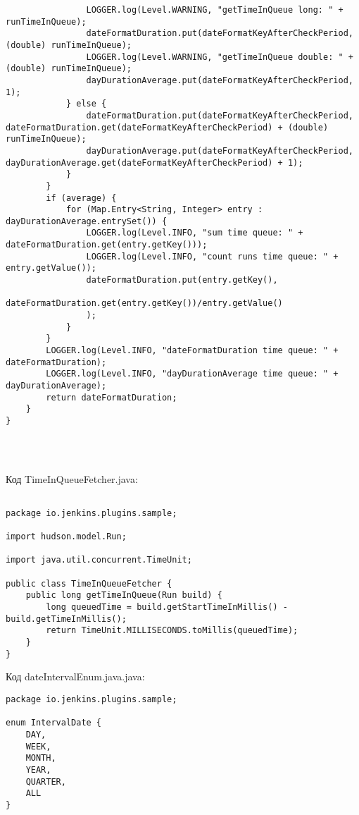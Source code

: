 \begin{lstlisting}
                LOGGER.log(Level.WARNING, "getTimeInQueue long: " + runTimeInQueue);
                dateFormatDuration.put(dateFormatKeyAfterCheckPeriod,  (double) runTimeInQueue);
                LOGGER.log(Level.WARNING, "getTimeInQueue double: " + (double) runTimeInQueue);
                dayDurationAverage.put(dateFormatKeyAfterCheckPeriod, 1);
            } else {
                dateFormatDuration.put(dateFormatKeyAfterCheckPeriod, dateFormatDuration.get(dateFormatKeyAfterCheckPeriod) + (double) runTimeInQueue);
                dayDurationAverage.put(dateFormatKeyAfterCheckPeriod, dayDurationAverage.get(dateFormatKeyAfterCheckPeriod) + 1);
            }
        }
        if (average) {
            for (Map.Entry<String, Integer> entry : dayDurationAverage.entrySet()) {
                LOGGER.log(Level.INFO, "sum time queue: " + dateFormatDuration.get(entry.getKey()));
                LOGGER.log(Level.INFO, "count runs time queue: " + entry.getValue());
                dateFormatDuration.put(entry.getKey(),
                        dateFormatDuration.get(entry.getKey())/entry.getValue()
                );
            }
        }
        LOGGER.log(Level.INFO, "dateFormatDuration time queue: " + dateFormatDuration);
        LOGGER.log(Level.INFO, "dayDurationAverage time queue: " + dayDurationAverage);
        return dateFormatDuration;
    }
}




\end{lstlisting}

Код TimeInQueueFetcher.java:

\begin{lstlisting}

package io.jenkins.plugins.sample;

import hudson.model.Run;

import java.util.concurrent.TimeUnit;

public class TimeInQueueFetcher {
    public long getTimeInQueue(Run build) {
        long queuedTime = build.getStartTimeInMillis() - build.getTimeInMillis();
        return TimeUnit.MILLISECONDS.toMillis(queuedTime);
    }
}

\end{lstlisting}

Код dateIntervalEnum.java.java:

\begin{lstlisting}
package io.jenkins.plugins.sample;

enum IntervalDate {
    DAY,
    WEEK,
    MONTH,
    YEAR,
    QUARTER,
    ALL
}


\end{lstlisting}

